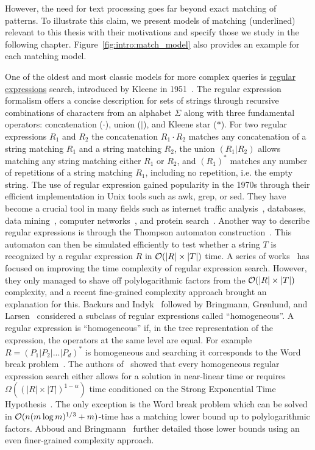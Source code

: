 However, the need for text processing goes far beyond exact matching of patterns. To illustrate this claim, we present models of matching (underlined) relevant to this thesis with their motivations and specify those we study in the following chapter. Figure~\ref{fig:intro:match_model} also provides an example for each matching model.

One of the oldest and most classic models for more complex queries is \ul{regular expressions} search, introduced by Kleene in 1951~\cite{RM-704}.
The regular expression formalism offers a concise description for sets of strings through recursive combinations of characters from an alphabet $\Sigma$ along with three fundamental operators: concatenation ($\cdot$), union ($|$), and Kleene star ($\ast$).
For two regular expressions $R_1$ and $R_2$ the concatenation $R_1\cdot R_2$ matches any concatenation of a string matching $R_1$ and a string matching $R_2$, the union $(R_1|R_2)$ allows matching any string matching either $R_1$ or $R_2$, and $(R_1)^\ast$ matches any number of repetitions of a string matching $R_1$, including no repetition, i.e. the empty string.
The use of regular expression gained popularity in the 1970s through their efficient implementation in Unix tools such as awk, grep, or sed.
They have become a crucial tool in many fields such as internet traffic analysis~\cite{4221791,4579527}, databases, data mining~\cite{1000341,10.5555/645927.672035,10.1145/375551.375569}, computer networks~\cite{10.1145/1159913.1159952}, and protein search~\cite{10.1145/369133.369220}.
Another way to describe regular expressions is through the Thompson automaton construction~\cite{Thompson_automaton}. This automaton can then be simulated efficiently to test whether a string $T$ is recognized by a regular expression $R$ in $\mathcal{O}(|R| \times |T|)$ time.
A series of works~\cite{10.1145/128749.128755,BILLE2008486,10.1007/978-3-642-02927-1_16,10.1007/11786986_56,doi:10.1137/1.9781611973075.104} has focused on improving the time complexity of regular expression search. However, they only managed to shave off polylogarithmic factors from the $\mathcal{O}(|R| \times |T|)$ complexity, and a recent fine-grained complexity approach brought an explanation for this.
Backurs and Indyk~\cite{DBLP:conf/focs/BackursI16} followed by Bringmann, Gr{\o}nlund, and Larsen~\cite{8104068} considered a subclass of regular expressions called ``homogeneous''. A regular expression is ``homogeneous'' if, in the tree representation of the expression, the operators at the same level are equal. For example $R=(P_1|P_2|...|P_d)^\ast$ is homogeneous and searching it corresponds to the Word break problem~\cite{wordbreak1,wordbreak2}. The authors of~\cite{DBLP:conf/focs/BackursI16,8104068} showed that every homogeneous regular expression search either allows for a solution in near-linear time or requires $\Omega((|R| \times |T|)^{1-\alpha})$ time conditioned on the Strong Exponential Time Hypothesis~\cite{IMPAGLIAZZO2001367}. The only exception is the Word break problem which can be solved in $\mathcal{O}(n (m \log m)^{1/3}+m)$-time has a matching lower bound up to polylogarithmic factors. Abboud and Bringmann~\cite{DBLP:conf/icalp/AbboudB18} further detailed those lower bounds using an even finer-grained complexity approach.
